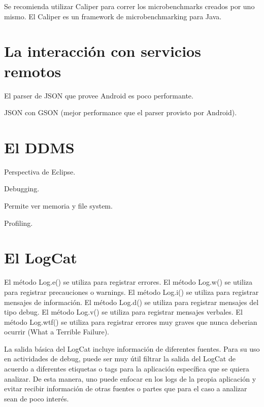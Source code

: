 Se recomienda utilizar Caliper para correr los microbenchmarks creados por uno mismo. El Caliper es un framework de microbenchmarking para Java.

\section{La interacción con servicios remotos}
\label{sec:remote.services}

El parser de JSON que provee Android es poco performante.

JSON con GSON (mejor performance que el parser provisto  por Android).

\section{El \ac{DDMS}}
\label{sec:ddms}

Perspectiva de Eclipse.

Debugging.

Permite ver memoria y file system.

Profiling.

\section{El LogCat}
\label{sec:logcat}

El m\'etodo Log.e() se utiliza para registrar errores.
El m\'etodo Log.w() se utiliza para registrar precauciones o warnings.
El m\'etodo Log.i() se utiliza para registrar mensajes de informaci\'on.
El m\'etodo Log.d() se utiliza para registrar mensajes del tipo debug.
El m\'etodo Log.v() se utiliza para registrar mensajes verbales.
El m\'etodo Log.wtf() se utiliza para registrar errores muy graves que nunca deberian ocurrir (What a Terrible Failure).

La salida b\'asica del LogCat incluye informaci\'on de diferentes fuentes. Para su uso en actividades de debug, puede ser muy \'util filtrar la salida del LogCat de acuerdo a diferentes etiquetas o tags para la aplicaci\'on espec\'ifica que se quiera analizar. De esta manera, uno puede enfocar en los logs de la propia aplicaci\'on y evitar recibir informaci\'on de otras fuentes o partes que para el caso a analizar sean de poco inter\'es.
